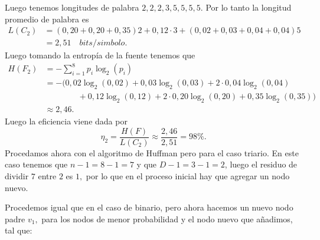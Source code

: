 \begin{sols}
 Luego tenemos longitudes de palabra $2,2,2,3,5,5,5,5.$ Por lo tanto la longitud promedio de palabra es
\begin{align*}
    L(C_2)&=(0,20+0,20+0,35)2+0,12\cdot3+(0,02+0,03+0,04+0,04)5\\
    &=2,51\quad bits/simbolo.
\end{align*}
Luego tomando la entropía de la fuente tenemos que
\begin{align*}
    H(F_2)&=-\sum_{i=1}^8p_i\log_2(p_i)\\
    &=-(0,02\log_2(0,02)+0,03\log_2(0,03)+2\cdot0,04\log_2(0,04)\\
    &\phantom{++++}+0,12\log_2(0,12)+2\cdot0,20\log_2(0,20)+0,35\log_2(0,35))\\
    &\approx 2,46.
\end{align*}
Luego la eficiencia viene dada por
$$\eta_2=\dfrac{H(F)}{L(C_2)}\approx\frac{2,46}{2,51}=98\%.$$
Procedamos ahora con el algoritmo de Huffman pero para el caso triario. En este caso tenemos que $n-1=8-1=7$ y que $D-1=3-1=2$, luego el residuo de dividir $7$ entre $2$ es $1,$ por lo que en el proceso inicial hay que agregar un nodo nuevo.
\begin{center}
    \end{center}
Procedemos igual que en el caso de binario, pero ahora hacemos un nuevo nodo padre $v_1,$ para los nodos de menor probabilidad y el nodo nuevo que añadimos, tal que:
\begin{center}
       \begin{tikzpicture}


\end{tikzpicture}
\end{center}
\end{sols}
